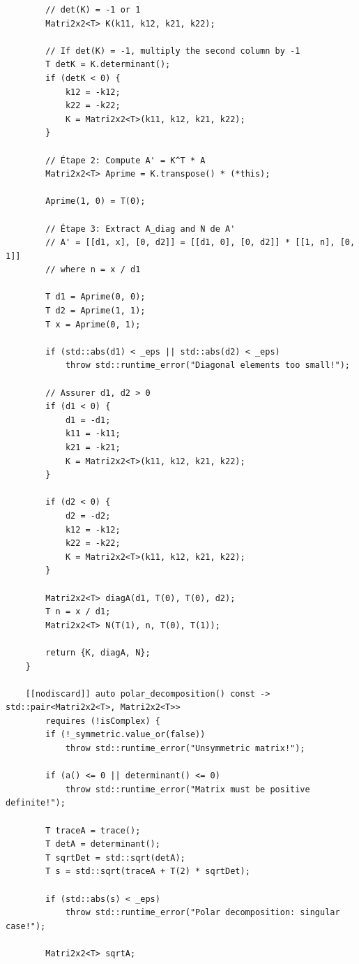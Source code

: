 \documentclass[11pt]{article}
\begin{document}
\begin{lstlisting}
        // det(K) = -1 or 1
        Matri2x2<T> K(k11, k12, k21, k22);
        
        // If det(K) = -1, multiply the second column by -1
        T detK = K.determinant();
        if (detK < 0) {
            k12 = -k12;
            k22 = -k22;
            K = Matri2x2<T>(k11, k12, k21, k22);
        }
        
        // Étape 2: Compute A' = K^T * A
        Matri2x2<T> Aprime = K.transpose() * (*this);
        
        Aprime(1, 0) = T(0);
        
        // Étape 3: Extract A_diag and N de A'
        // A' = [[d1, x], [0, d2]] = [[d1, 0], [0, d2]] * [[1, n], [0, 1]]
        // where n = x / d1
        
        T d1 = Aprime(0, 0);
        T d2 = Aprime(1, 1);
        T x = Aprime(0, 1);
        
        if (std::abs(d1) < _eps || std::abs(d2) < _eps)
            throw std::runtime_error("Diagonal elements too small!");
        
        // Assurer d1, d2 > 0
        if (d1 < 0) {
            d1 = -d1;
            k11 = -k11;
            k21 = -k21;
            K = Matri2x2<T>(k11, k12, k21, k22);
        }
        
        if (d2 < 0) {
            d2 = -d2;
            k12 = -k12;
            k22 = -k22;
            K = Matri2x2<T>(k11, k12, k21, k22);
        }
        
        Matri2x2<T> diagA(d1, T(0), T(0), d2);
        T n = x / d1;
        Matri2x2<T> N(T(1), n, T(0), T(1));
        
        return {K, diagA, N};
    }

    [[nodiscard]] auto polar_decomposition() const -> std::pair<Matri2x2<T>, Matri2x2<T>> 
        requires (!isComplex) {
        if (!_symmetric.value_or(false))
            throw std::runtime_error("Unsymmetric matrix!");
        
        if (a() <= 0 || determinant() <= 0)
            throw std::runtime_error("Matrix must be positive definite!");
        
        T traceA = trace();
        T detA = determinant();    
        T sqrtDet = std::sqrt(detA);
        T s = std::sqrt(traceA + T(2) * sqrtDet);
        
        if (std::abs(s) < _eps)
            throw std::runtime_error("Polar decomposition: singular case!");
        
        Matri2x2<T> sqrtA;
        

\end{lstlisting}
\end{document}
